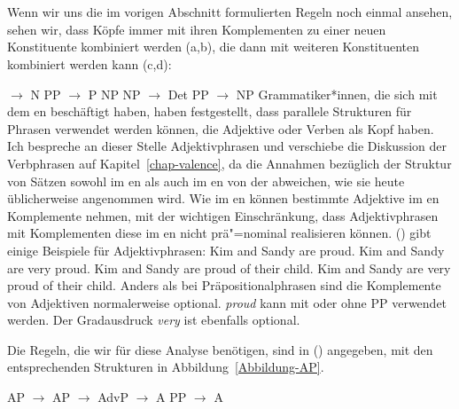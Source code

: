 \section{\xbart}
\label{sec-xbar}

Wenn wir uns die im vorigen Abschnitt formulierten Regeln noch einmal ansehen, sehen wir, dass Köpfe immer
mit ihren Komplementen zu einer neuen Konstituente kombiniert werden (a,b), die dann mit weiteren Konstituenten kombiniert werden kann (c,d):

\eal
\ex \nbar $\to$ N PP
\ex \pbar $\to$ P NP
\ex\label{Regel-NP-Xbar}
    NP $\to$ Det \nbar
\ex PP $\to$ NP \pbar
\zl
%
Grammatiker*innen, die sich mit dem en beschäftigt haben, haben festgestellt, dass parallele Strukturen für Phrasen verwendet werden können, die Adjektive oder Verben als Kopf haben.
Ich bespreche an dieser Stelle Adjektivphrasen und verschiebe die Diskussion der Verbphrasen auf
Kapitel~\ref{chap-valence}, da die Annahmen bezüglich der Struktur von Sätzen sowohl im en
als auch im en von der \xbart abweichen, wie sie heute üblicherweise angenommen wird. Wie im en können bestimmte Adjektive
im en Komplemente nehmen, mit der wichtigen Einschränkung, dass Adjektivphrasen mit Komplementen diese im en nicht prä"=nominal realisieren können.
() gibt einige Beispiele für Adjektivphrasen:
\eal
\ex Kim and Sandy are proud.
\ex Kim and Sandy are very proud.
\ex Kim and Sandy are proud of their child.
\ex Kim and Sandy are very proud of their child.
\zl
Anders als bei Präpositionalphrasen sind die Komplemente von Adjektiven normalerweise optional. \emph{proud} kann mit oder ohne PP verwendet werden.
Der Gradausdruck \emph{very} ist ebenfalls optional.

Die Regeln, die wir für diese Analyse benötigen, sind in () angegeben, mit den entsprechenden Strukturen in Abbildung~\vref{Abbildung-AP}.

\begin{samepage}
\eal
\ex AP $\to$ \abar
\ex AP $\to$ AdvP \abar
\ex \abar $\to$ A PP
\ex \abar $\to$ A
\zl
\end{samepage}

